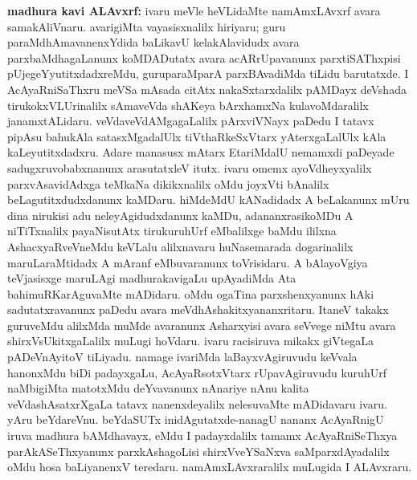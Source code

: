 {\large\textbf{madhura kavi ALAvxrf:}} ivaru meVle heVLidaMte namAmxLAvxrf avara samakAliVnaru. avarigiMta vayasisxnalilx hiriyaru; guru paraMdhAmavanenxYdida baLikavU kelakAlavidudx avara parxbaMdhagaLanunx koMDADutatx avara acARrUpavanunx parxtiSAThxpisi pUjegeYyutitxdadxreMdu, guruparaMparA parxBAvadiMda tiLidu barutatxde. I AcAyaRniSaThxru meVSa mAsada citAtx nakaSxtarxdalilx pAMDayx deVshada tirukokxVLUrinalilx sAmaveVda shAKeya bArxhamxNa kulavoMdaralilx janamxtALidaru. veVdaveVdAMgagaLalilx pArxviVNayx paDedu I tatavx pipAsu bahukAla satasxMgadalUlx tiVthaRkeSxVtarx yAterxgaLalUlx kAla kaLeyutitxdadxru. Adare manasusx mAtarx EtariMdalU nemamxdi paDeyade sadugxruvobabxnanunx arasutatxleV itutx. ivaru omemx ayoVdheyxyalilx parxvAsavidAdxga teMkaNa dikikxnalilx oMdu joyxVti bAnalilx beLagutitxdudxdanunx kaMDaru. hiMdeMdU kANadidadx A beLakanunx mUru dina nirukisi adu neleyAgidudxdanunx kaMDu, adananxrasikoMDu A niTiTxnalilx payaNisutAtx tirukuruhUrf eMbalilxge baMdu ililxna AshacxyaRveVneMdu keVLalu alilxnavaru huNasemarada dogarinalilx maruLaraMtidadx A mAranf eMbuvaranunx toVrisidaru. A bAlayoVgiya teVjasisxge maruLAgi madhurakavigaLu upAyadiMda Ata bahimuRKarAguvaMte mADidaru. oMdu ogaTina parxshenxyanunx hAki sadutatxravanunx paDedu avara meVdhAshakitxyananxritaru. ItaneV takakx guruveMdu alilxMda muMde avaranunx Asharxyisi avara seVvege niMtu avara shirxVsUkitxgaLalilx muLugi hoVdaru. ivaru racisiruva mikakx giVtegaLa pADeVnAyitoV tiLiyadu. namage ivariMda laBayxvAgiruvudu keVvala hanonxMdu biDi padayxgaLu, AcAyaRsotxVtarx rUpavAgiruvudu kuruhUrf naMbigiMta matotxMdu deYvavanunx nAnariye nAnu kalita veVdashAsatxrXgaLa tatavx nanenxdeyalilx nelesuvaMte mADidavaru ivaru. yAru beYdareVnu. beYdaSUTx inidAgutatxde-nanagU nananx AcAyaRnigU iruva madhura bAMdhavayx, eMdu I padayxdalilx tamamx AcAyaRniSeThxya parAkASeThxyanunx parxkAshagoLisi shirxVveYSaNxva saMparxdAyadalilx oMdu hosa baLiyanenxV teredaru. namAmxLAvxraralilx muLugida I ALAvxraru.

